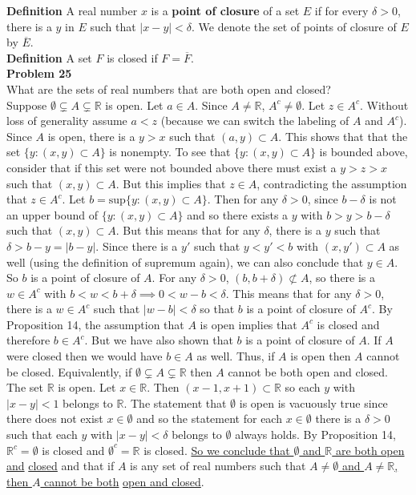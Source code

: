 \documentclass[a4paper]{article}
\begin{document}
{\bf Definition} A real number $x$ is a {\bf point of closure} of a set $E$ if for every $\delta > 0$, there is a $y$ in $E$ such that $|x-y|<\delta$. We denote the set of points of closure of $E$ by $\overline{E}$.\\

{\bf Definition} A set $F$ is closed if $F = \overline{F}$.\\

{\bf Problem 25}\\
What are the sets of real numbers that are both open and closed?\\

Suppose $\emptyset \subsetneq A \subsetneq \mathbb{R}$ is open. Let $a \in A$. Since $A\neq \mathbb{R}$, $A^c \neq \emptyset$. Let $z \in A^c$. Without loss of generality assume $a<z$ (because we can switch the labeling of $A$ and $A^c$). Since $A$ is open, there is a $y>x$ such that $(a,y) \subset A$. This shows that that the set $\{y : (x,y) \subset A\}$ is nonempty. To see that $\{y : (x,y) \subset A\}$ is bounded above, consider that if this set were not bounded above there must exist a $y> z > x$ such that $(x,y) \subset A$. But this implies that $z \in A$, contradicting the assumption that $z \in A^c$. Let $b = \text{sup}\{y : (x,y) \subset A\}$. Then for any $\delta >0$, since $b-\delta$ is not an upper bound of $\{y : (x,y) \subset A\}$ and so there exists a $y$ with $b>y>b-\delta$ such that $(x,y) \subset A$. But this means that for any $\delta$, there is a $y$ such that $\delta > b-y = |b-y|$. Since there is a $y'$ such that $y<y'<b$ with $(x,y') \subset A$ as well (using the definition of supremum again), we can also conclude that $y \in A$. So $b$ is a point of closure of $A$. For any $\delta > 0$, $(b,b+\delta) \not\subset A$, so there is a $w \in A^c$ with $b<w<b+\delta \implies 0<w-b<\delta$. This means that for any $\delta >0$, there is a $w \in A^c$ such that $|w-b| < \delta$ so that $b$ is a point of closure of $A^c$. By Proposition 14, the assumption that $A$ is open implies that $A^c$ is closed and therefore $b \in A^c$. But we have also shown that $b$ is a point of closure of $A$. If $A$ were closed then we would have $b \in A$ as well. Thus, if $A$ is open then $A$ cannot be closed. Equivalently, if $\emptyset \subsetneq A \subsetneq \mathbb{R}$ then $A$ cannot be both open and closed. \\

The set $\mathbb{R}$ is open. Let $x \in \mathbb{R}$. Then $(x-1, x+1) \subset \mathbb{R}$ so each $y$ with $|x-y| < 1$ belongs to $\mathbb{R}$. The statement that $\emptyset$ is open is vacuously true since there does not exist $x \in \emptyset$ and so the statement for each $x \in \emptyset$ there is a $\delta>0$ such that each $y$ with $|x-y| < \delta$ belongs to $\emptyset$ always holds. By Proposition 14, $\mathbb{R}^c = \emptyset$ is closed and $\emptyset^c = \mathbb{R}$ is closed. \underline{So we conclude that $\emptyset$ and $ \mathbb{R}$ are both open and} \underline{closed} and that if $A$ is any set of real numbers such that \underline{$A\neq \emptyset$ and $A \neq \mathbb{R}$, then $A$ cannot be both} \underline{open and closed}.\\
\end{document}
